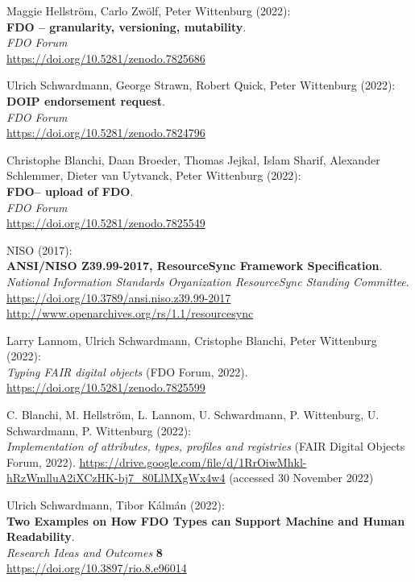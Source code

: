 \begin{thebibliography}{9}
Maggie Hellström, Carlo Zwölf, Peter Wittenburg (2022): \\
\textbf{FDO -- granularity, versioning, mutability}. \\
\emph{FDO Forum}\\
\url{https://doi.org/10.5281/zenodo.7825686}

Ulrich Schwardmann, George Strawn, Robert Quick, Peter Wittenburg (2022): \\
\textbf{DOIP endorsement request}.\\
\emph{FDO Forum}\\
\url{https://doi.org/10.5281/zenodo.7824796}

Christophe Blanchi, Daan Broeder, Thomas Jejkal, Islam Sharif, Alexander
Schlemmer, Dieter van Uytvanck, Peter Wittenburg (2022): \\
\textbf{FDO-- upload of FDO}.\\
\emph{FDO Forum}\\
\url{https://doi.org/10.5281/zenodo.7825549}

NISO (2017):\\
\textbf{ANSI/NISO Z39.99-2017, ResourceSync Framework Specification}.
\emph{National Information Standards Organization ResourceSync Standing Committee}.
\url{https://doi.org/10.3789/ansi.niso.z39.99-2017}\\
\url{http://www.openarchives.org/rs/1.1/resourcesync}

Larry Lannom, Ulrich Schwardmann, Cristophe Blanchi, Peter Wittenburg
(2022): \\
\emph{Typing {FAIR} digital objects} ({FDO Forum}, 2022).
\url{https://doi.org/10.5281/zenodo.7825599}

C. Blanchi, M. Hellström, L. Lannom, U. Schwardmann, P. Wittenburg, U.
Schwardmann, P. Wittenburg (2022): \\
\emph{Implementation of
attributes, types, profiles and registries} ({FAIR Digital Objects
Forum}, 2022).
\url{https://drive.google.com/file/d/1RrOiwMhkl-hRzWmlluA2iXCzHK-bj7_80LlMXgWx4w4}
(accessed 30 November 2022)

Ulrich Schwardmann, Tibor Kálmán (2022): \\
\textbf{Two {Examples} on {How FDO Types} can {Support Machine} and {Human Readability}}.\\
\emph{Research Ideas and Outcomes} \textbf{8} \\
\url{https://doi.org/10.3897/rio.8.e96014}


\end{thebibliography}
